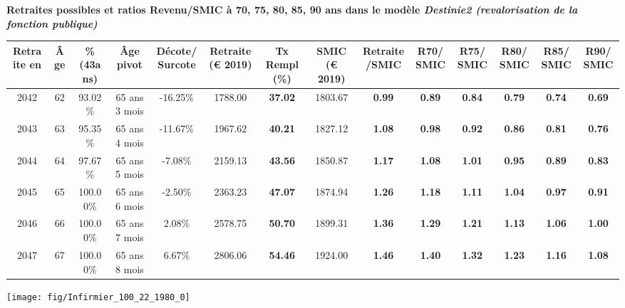  \vspace{0.1cm} 
{\bf \noindent Retraites possibles et ratios Revenu/SMIC à 70, 75, 80, 85, 90 ans dans le modèle \emph{Destinie2 (revalorisation de la fonction publique)}}  
 
\begin{adjustbox}{max width=\textwidth} 
\begin{tabular}[htb]{|c|c||c|c|c||c|c||c|c||c|c|c|c|c|} 
\hline 
 Retraite en &  Âge &  \%(43ans) &  Âge pivot &  Décote/Surcote &  Retraite (\euro{} 2019) &  Tx Rempl(\%) &  SMIC (\euro{} 2019) &  Retraite/SMIC &  R70/SMIC &  R75/SMIC &  R80/SMIC &  R85/SMIC &  R90/SMIC \\ 
\hline \hline 
 2042 &  62 &  93.02\% &  65 ans 3 mois &  -16.25\% &  1788.00 &  {\bf 37.02} &  1803.67 &  {\bf {\color{red} 0.99}} &  {\bf {\color{red} 0.89}} &  {\bf {\color{red} 0.84}} &  {\bf {\color{red} 0.79}} &  {\bf {\color{red} 0.74}} &  {\bf {\color{red} 0.69}} \\ 
\hline 
 2043 &  63 &  95.35\% &  65 ans 4 mois &  -11.67\% &  1967.62 &  {\bf 40.21} &  1827.12 &  {\bf 1.08} &  {\bf {\color{red} 0.98}} &  {\bf {\color{red} 0.92}} &  {\bf {\color{red} 0.86}} &  {\bf {\color{red} 0.81}} &  {\bf {\color{red} 0.76}} \\ 
\hline 
 2044 &  64 &  97.67\% &  65 ans 5 mois &  -7.08\% &  2159.13 &  {\bf 43.56} &  1850.87 &  {\bf 1.17} &  {\bf 1.08} &  {\bf 1.01} &  {\bf {\color{red} 0.95}} &  {\bf {\color{red} 0.89}} &  {\bf {\color{red} 0.83}} \\ 
\hline 
 2045 &  65 &  100.00\% &  65 ans 6 mois &  -2.50\% &  2363.23 &  {\bf 47.07} &  1874.94 &  {\bf 1.26} &  {\bf 1.18} &  {\bf 1.11} &  {\bf 1.04} &  {\bf {\color{red} 0.97}} &  {\bf {\color{red} 0.91}} \\ 
\hline 
 2046 &  66 &  100.00\% &  65 ans 7 mois &  2.08\% &  2578.75 &  {\bf 50.70} &  1899.31 &  {\bf 1.36} &  {\bf 1.29} &  {\bf 1.21} &  {\bf 1.13} &  {\bf 1.06} &  {\bf {\color{red} 1.00}} \\ 
\hline 
 2047 &  67 &  100.00\% &  65 ans 8 mois &  6.67\% &  2806.06 &  {\bf 54.46} &  1924.00 &  {\bf 1.46} &  {\bf 1.40} &  {\bf 1.32} &  {\bf 1.23} &  {\bf 1.16} &  {\bf 1.08} \\ 
\hline 
\hline 
\end{tabular} 
\end{adjustbox} 
 
 \vspace{0.1cm} 

 {\hspace{-2.2cm}\texttt{[image: fig/Infirmier\_100\_22\_1980\_0]}} 

